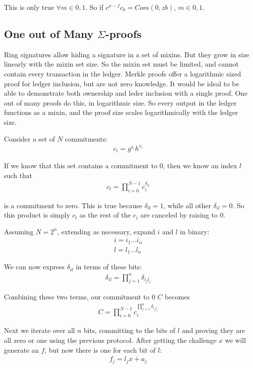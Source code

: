 \documentclass{article}
\begin{document}
This is only true $\forall m \in {0,1}$.  So if $c^{x-f} c_b = Com(0,zb)$, $m \in {0,1}$.


\subsection{One out of Many $\Sigma$-proofs}

Ring signatures allow hiding a signature in a set of mixins.  But they grow in size linearly with the mixin set size.  So the mixin set must be limited, and cannot contain every transaction in the ledger.  Merkle proofs offer a logarithmic sized proof for ledger inclusion, but are not zero knowledge.  It would be ideal to be able to demonstrate both ownership and leder inclusion with a single proof.  One out of many proofs do this, in logarithmic size.  So every output in the ledger functions as a mixin, and the proof size scales logarithmically with the ledger size.

Consider a set of $N$ commitments:
\begin{align}
  c_i = g^{s_i} h^{v_i}
\end{align}

If we know that this set contains a commitment to $0$, then we know an index $l$ such that
\begin{align}
  c_l = \prod_{i=0}^{N-1} c_i^{\delta_{il}}
\end{align}

is a commitment to zero.  This is true because $\delta_{ll} = 1$, while all other $\delta_{il} = 0$. So this product is simply $c_l$ as the rest of the $c_i$ are canceled by raising to $0$.

Assuming $N = 2^n$, extending as necessary, expand $i$ and $l$ in binary:
\begin{align}
  i = i_1...i_n\\
  l = l_1...l_n
\end{align}

We can now express $\delta_{il}$ in terms of these bits:
\begin{align}
  \delta_{il} = \prod_{j=1}^{n} \delta_{i_jl_j}
\end{align}
  
Combining these two terms, our commitment to $0$ $C$ becomes
\begin{align}
  C = \prod_{i=0}^{N-1}c_i^{\prod_{j=1}^{n} \delta_{i_jl_j}}
\end{align}

Next we iterate over all $n$ bits, committing to the bits of $l$ and proving they are all zero or one using the previous protocol.  After getting the challenge $x$ we will generate an $f$, but now there is one for each bit of $l$:
\begin{align}
  f_j = l_j x + a_j
\end{align}
\end{document}
